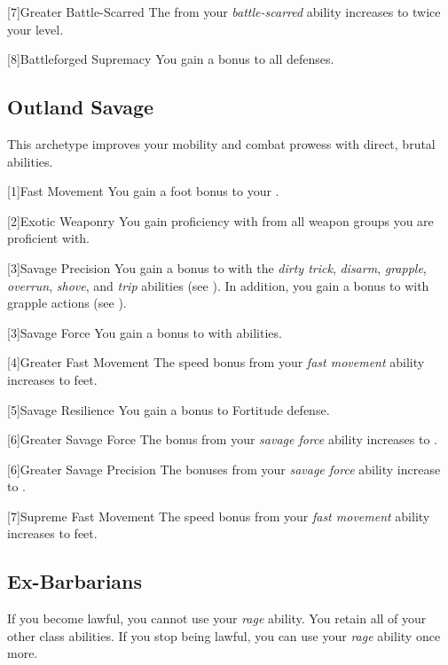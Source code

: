         [7]{Greater Battle-Scarred}
        The  from your \textit{battle-scarred} ability increases to twice your level.

        [8]{Battleforged Supremacy}
        You gain a  bonus to all defenses.

    \subsection{Outland Savage}
        This archetype improves your mobility and combat prowess with direct, brutal abilities.

        [1]{Fast Movement} You gain a  foot bonus to your .

        [2]{Exotic Weaponry} You gain proficiency with  from all weapon groups you are proficient with.

        [3]{Savage Precision} You gain a  bonus to  with the \textit{dirty trick}, \textit{disarm}, \textit{grapple}, \textit{overrun}, \textit{shove}, and \textit{trip} abilities (see ).
        In addition, you gain a  bonus to  with grapple actions (see ).

        [3]{Savage Force} You gain a  bonus to  with  abilities.

        [4]{Greater Fast Movement} The speed bonus from your \textit{fast movement} ability increases to  feet.

        [5]{Savage Resilience} You gain a  bonus to Fortitude defense.

        [6]{Greater Savage Force} The bonus from your \textit{savage force} ability increases to .

        [6]{Greater Savage Precision} The bonuses from your \textit{savage force} ability increase to .

        [7]{Supreme Fast Movement} The speed bonus from your \textit{fast movement} ability increases to  feet.

    \subsection{Ex-Barbarians}
        If you become lawful, you cannot use your \textit{rage} ability.
        You retain all of your other class abilities.
        If you stop being lawful, you can use your \textit{rage} ability once more.

